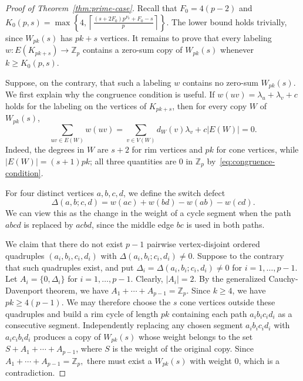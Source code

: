 \documentclass[11pt]{article}
\theoremstyle{remark}
\newcommand{\Z}{\mathbb Z}
\begin{document}
\begin{proof}[Proof of Theorem~\ref{thm:prime-case}]
    Recall that $F_0=4(p-2)$ and $ K_0(p,s)=\max\left\{4,\left\lceil\frac{(s+2F_0)p^{F_0}+F_0-s}{p}\right\rceil\right\}.$
    The lower bound holds trivially, since $W_{pk}(s)$ has $pk+s$ vertices.
    It remains to prove that every labeling $w \colon E(K_{pk+s})\to\Z_p$ contains a zero-sum copy of $W_{pk}(s)$ whenever $k\ge K_0(p,s)$.

    Suppose, on the contrary, that such a labeling $w$ contains no zero-sum $W_{pk}(s)$.
    We first explain why the congruence condition is useful.
    If $w(uv)=\lambda_u+\lambda_v+c$ holds for the labeling on the vertices of $K_{pk+s}$, then for every copy $W$ of $W_{pk}(s)$,
    \begin{equation}\label{eq:zero-vanishes}
        \sum_{uv\in E(W)}w(uv)=\sum_{v\in V(W)}d_W(v)\lambda_v+c|E(W)|=0.
    \end{equation}
    Indeed, the degrees in $W$ are $s+2$ for rim vertices and $pk$ for cone vertices, while $|E(W)|=(s+1)pk$; all three quantities are $0$ in $\Z_p$ by~\eqref{eq:congruence-condition}.

    For four distinct vertices $a,b,c,d$, we define the switch defect
    \begin{equation}\label{eq:switch-defect}
        \Delta(a,b;c,d)=w(ac)+w(bd)-w(ab)-w(cd).
    \end{equation}
    We can view this as the change in the weight of a cycle segment when the path $abcd$ is replaced by $acbd$, since the middle edge $bc$ is used in both paths.

    We claim that there do not exist $p-1$ pairwise vertex-disjoint ordered quadruples $(a_i,b_i,c_i,d_i)$ with $\Delta(a_i,b_i;c_i,d_i)\ne0$.
    Suppose to the contrary that such quadruples exist, and put
    $\Delta_i=\Delta(a_i,b_i;c_i,d_i)\ne0$ for $i=1,\ldots,p-1$.
    Let $A_i=\{0,\Delta_i\}$ for $i=1,\ldots,p-1$.
    Clearly, $|A_i|=2.$
    By the generalized Cauchy-Davenport theorem, we have
    $A_1+\cdots+A_{p-1}=\Z_p.$
    Since $k\ge4$, we have $pk\ge4(p-1)$.  We may therefore choose the $s$ cone vertices outside these quadruples and build a rim cycle of length $pk$ containing each path $a_ib_ic_id_i$ as a consecutive segment.
    Independently replacing any chosen segment $a_ib_ic_id_i$ with $a_ic_ib_id_i$ produces a copy of $W_{pk}(s)$ whose weight belongs to the set $S+A_1+\cdots+A_{p-1}$, where $S$ is the weight of the original copy.
    Since $A_1+\cdots+A_{p-1}=\Z_p,$ there must exist a $W_{pk}(s)$ with weight $0$, which is a contradiction.


\end{proof}
\end{document}
